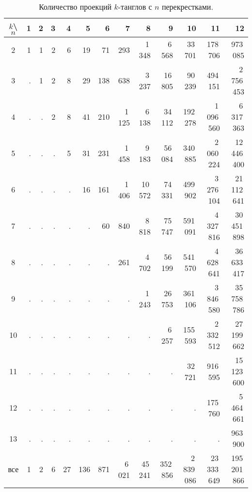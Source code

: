 		\begin{landscape}
		\begin{table}[ht]
			\caption{Количество проекций $k$-танглов с $n$ перекрестками.\label{table:tangle-projections}}
			\centering
			\begin{tabular}{|c||r|r|r|r|r|r|r|r|r|r|r|r|}
			\hline
			$k$\textbackslash $n$
			    & 1 & 2 & 3 &  4 &   5 &   6 &      7 &       8 &        9 &          10 &           11 &            12 \\
			\hline\hline
			2   & 1 & 1 & 2 &  6 &  19 &  71 &    293 &  1\,348 &   6\,568 &     33\,701 &     178\,706 &      973\,085 \\
			3   & . & 1 & 2 &  8 &  29 & 138 &    638 &  3\,237 &  16\,805 &     90\,239 &     494\,151 &   2\,756\,453 \\
			4   & . & . & 2 &  8 &  41 & 210 & 1\,125 &  6\,138 &  34\,112 &    192\,278 &  1\,096\,560 &   6\,317\,363 \\
			5   & . & . & . &  5 &  31 & 231 & 1\,458 &  9\,183 &  56\,084 &    340\,885 &  2\,060\,224 &  12\,446\,400 \\
			6   & . & . & . &  . &  16 & 161 & 1\,406 & 10\,572 &  74\,331 &    499\,902 &  3\,276\,104 &  21\,112\,641 \\
			7   & . & . & . &  . &   . &  60 &    840 &  8\,818 &  75\,747 &    591\,091 &  4\,327\,816 &  30\,451\,898 \\
			8   & . & . & . &  . &   . &   . &    261 &  4\,702 &  56\,199 &    541\,570 &  4\,628\,641 &  36\,633\,417 \\
			9   & . & . & . &  . &   . &   . &      . &  1\,243 &  26\,753 &    361\,106 &  3\,846\,580 &  35\,758\,786 \\
			10  & . & . & . &  . &   . &   . &      . &       . &   6\,257 &    155\,593 &  2\,332\,512 &  27\,199\,662 \\
			11  & . & . & . &  . &   . &   . &      . &       . &        . &     32\,721 &     916\,595 &  15\,123\,600 \\
			12  & . & . & . &  . &   . &   . &      . &       . &        . &           . &     175\,760 &   5\,464\,661 \\
			13  & . & . & . &  . &   . &   . &      . &       . &        . &           . &            . &      963\,900 \\
			\hline
			все & 1 & 2 & 6 & 27 & 136 & 871 & 6\,021 & 45\,241 & 352\,856 & 2\,839\,086 & 23\,333\,649 & 195\,201\,866 \\
			\hline
			\end{tabular}
		\end{table}
		\end{landscape}
